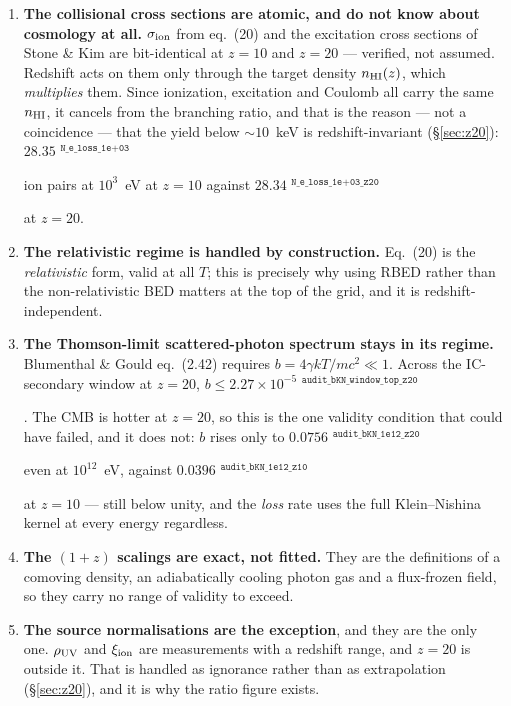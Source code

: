 \documentclass[11pt,a4paper]{article}
\newif\ifprovdraft
\newcommand{\src}[1]{%
  \ifprovdraft
    \ifmmode{}^{\text{\color{gray}\scriptsize\texttt{#1}}}%
    \else{\color{gray}\scriptsize$^{\texttt{#1}}$}%
    \fi
  \fi}
\begin{document}
\begin{enumerate}\itemsep3pt
\item \textbf{The collisional cross sections are atomic, and do not know about
      cosmology at all.} $\sigma_{\rm ion}$ from eq.~(20) and the excitation
      cross sections of Stone \& Kim are bit-identical at $z=10$ and $z=20$ ---
      verified, not assumed. Redshift acts on them only through the target
      density $n_{\rm HI}(z)$, which \emph{multiplies} them. Since ionization,
      excitation and Coulomb all carry the same $n_{\rm HI}$, it cancels from
      the branching ratio, and that is the reason --- not a coincidence --- that
      the yield below $\sim\!10$~keV is redshift-invariant
      (\S\ref{sec:z20}): $28.35$\src{N\_e\_loss\_1e+03} ion pairs at $10^3$~eV at
      $z=10$ against $28.34$\src{N\_e\_loss\_1e+03\_z20} at $z=20$.
\item \textbf{The relativistic regime is handled by construction.} Eq.~(20) is
      the \emph{relativistic} form, valid at all $T$; this is precisely why using
      RBED rather than the non-relativistic BED matters at the top of the grid,
      and it is redshift-independent.
\item \textbf{The Thomson-limit scattered-photon spectrum stays in its regime.}
      Blumenthal \& Gould eq.~(2.42) requires $b = 4\gamma kT/mc^2 \ll 1$. Across
      the IC-secondary window at $z=20$, $b \le
      2.27\times10^{-5}$\src{audit\_bKN\_window\_top\_z20}. The CMB is hotter at
      $z=20$, so this is the one validity condition that could have failed, and
      it does not: $b$ rises only to
      $0.0756$\src{audit\_bKN\_1e12\_z20} even at $10^{12}$~eV, against
      $0.0396$\src{audit\_bKN\_1e12\_z10} at $z=10$ --- still below unity, and the
      \emph{loss} rate uses the full Klein--Nishina kernel at every energy
      regardless.
\item \textbf{The $(1+z)$ scalings are exact, not fitted.} They are the
      definitions of a comoving density, an adiabatically cooling photon gas and
      a flux-frozen field, so they carry no range of validity to exceed.
\item \textbf{The source normalisations are the exception}, and they are the only
      one. $\rho_{\rm UV}$ and $\xi_{\rm ion}$ are measurements with a redshift
      range, and $z=20$ is outside it. That is handled as ignorance rather than
      as extrapolation (\S\ref{sec:z20}), and it is why the ratio figure exists.
\end{enumerate}
\end{document}
